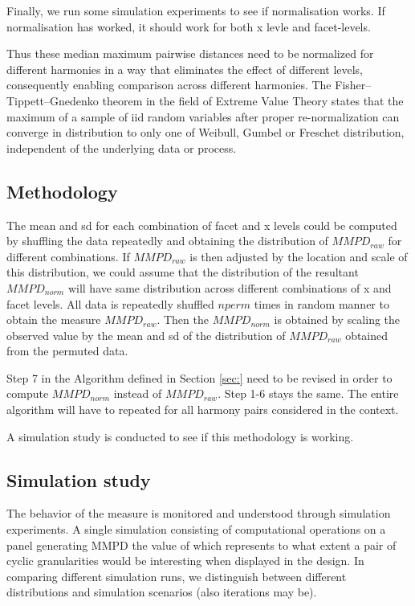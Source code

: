 \documentclass[
]{article}
\begin{document}
Finally, we run some simulation experiments to see if normalisation works. If normalisation has worked, it should work for both x levle and facet-levels.

Thus these median maximum pairwise distances need to be normalized for different harmonies in a way that eliminates the effect of different levels, consequently enabling comparison across different harmonies. The Fisher--Tippett--Gnedenko theorem in the field of Extreme Value Theory states that the maximum of a sample of iid random variables after proper re-normalization can converge in distribution to only one of Weibull, Gumbel or Freschet distribution, independent of the underlying data or process.

\hypertarget{methodology}{%
\subsection{Methodology}\label{methodology}}

The mean and sd for each combination of facet and x levels could be computed by shuffling the data repeatedly and obtaining the distribution of \(MMPD_{raw}\) for different combinations. If \(MMPD_{raw}\) is then adjusted by the location and scale of this distribution, we could assume that the distribution of the resultant \(MMPD_{norm}\) will have same distribution across different combinations of x and facet levels. All data is repeatedly shuffled \(nperm\) times in random manner to obtain the measure \(MMPD_{raw}\). Then the \(MMPD_{norm}\) is obtained by scaling the observed value by the mean and sd of the distribution of \(MMPD_{raw}\) obtained from the permuted data.

\noindent Step 7 in the Algorithm defined in Section \ref{sec:} need to be revised in order to compute \(MMPD_{norm}\) instead of \(MMPD_{raw}\). Step 1-6 stays the same. The entire algorithm will have to repeated for all harmony pairs considered in the context.

A simulation study is conducted to see if this methodology is working.

\hypertarget{simulation-study}{%
\subsection{Simulation study}\label{simulation-study}}

The behavior of the measure is monitored and understood through simulation experiments. A single simulation consisting of computational operations on a panel generating MMPD the value of which represents to what extent a pair of cyclic granularities would be interesting when displayed in the design. In comparing different simulation runs, we distinguish between different distributions and simulation scenarios (also iterations may be).
\end{document}
